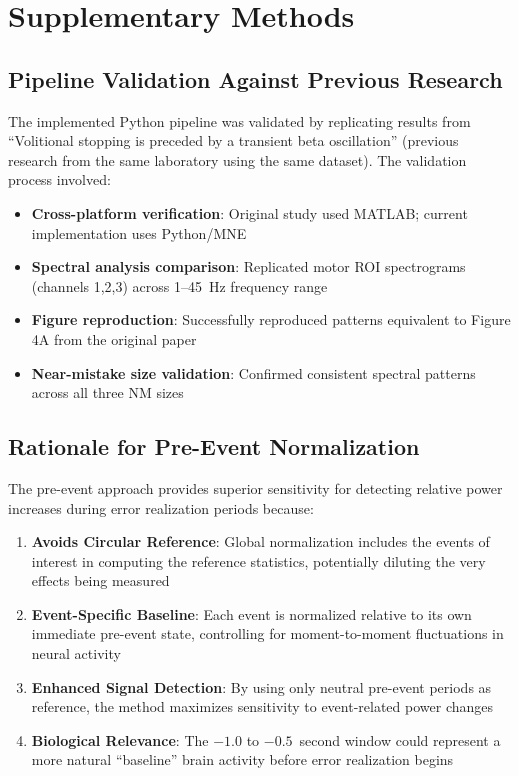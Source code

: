 \documentclass[11pt]{article}
\begin{document}
\appendix

\section{Supplementary Methods}

\subsection{Pipeline Validation Against Previous Research}

The implemented Python pipeline was validated by replicating results from ``Volitional stopping is preceded by a transient beta oscillation'' (previous research from the same laboratory using the same dataset). The validation process involved:

\begin{itemize}
\item \textbf{Cross-platform verification}: Original study used MATLAB; current implementation uses Python/MNE
\item \textbf{Spectral analysis comparison}: Replicated motor ROI spectrograms (channels 1,2,3) across 1--45~Hz frequency range
\item \textbf{Figure reproduction}: Successfully reproduced patterns equivalent to Figure 4A from the original paper
\item \textbf{Near-mistake size validation}: Confirmed consistent spectral patterns across all three NM sizes
\end{itemize}


\subsection{Rationale for Pre-Event Normalization}

The pre-event approach provides superior sensitivity for detecting relative power increases during error realization periods because:

\begin{enumerate}
\item \textbf{Avoids Circular Reference}: Global normalization includes the events of interest in computing the reference statistics, potentially diluting the very effects being measured
\item \textbf{Event-Specific Baseline}: Each event is normalized relative to its own immediate pre-event state, controlling for moment-to-moment fluctuations in neural activity
\item \textbf{Enhanced Signal Detection}: By using only neutral pre-event periods as reference, the method maximizes sensitivity to event-related power changes
\item \textbf{Biological Relevance}: The $-1.0$ to $-0.5$~second window could represent a more natural ``baseline'' brain activity before error realization begins
\end{enumerate}
\end{document}
